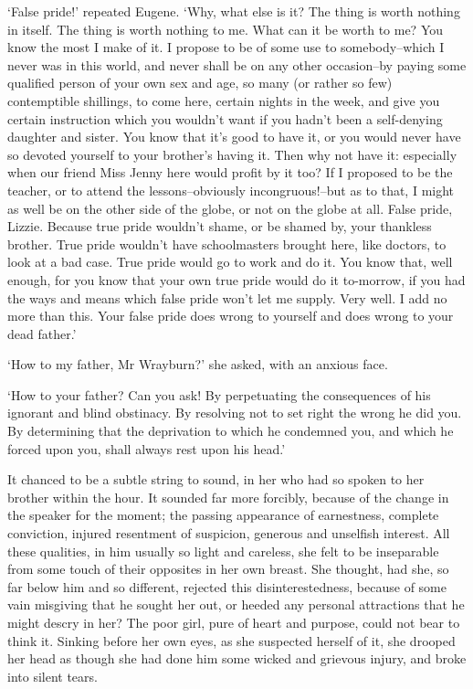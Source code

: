 ‘False pride!’ repeated Eugene. ‘Why, what else is it? The thing is
worth nothing in itself. The thing is worth nothing to me. What can it
be worth to me? You know the most I make of it. I propose to be of some
use to somebody--which I never was in this world, and never shall be on
any other occasion--by paying some qualified person of your own sex and
age, so many (or rather so few) contemptible shillings, to come here,
certain nights in the week, and give you certain instruction which you
wouldn’t want if you hadn’t been a self-denying daughter and sister.
You know that it’s good to have it, or you would never have so devoted
yourself to your brother’s having it. Then why not have it: especially
when our friend Miss Jenny here would profit by it too? If I proposed to
be the teacher, or to attend the lessons--obviously incongruous!--but
as to that, I might as well be on the other side of the globe, or not
on the globe at all. False pride, Lizzie. Because true pride wouldn’t
shame, or be shamed by, your thankless brother. True pride wouldn’t have
schoolmasters brought here, like doctors, to look at a bad case. True
pride would go to work and do it. You know that, well enough, for you
know that your own true pride would do it to-morrow, if you had the ways
and means which false pride won’t let me supply. Very well. I add no
more than this. Your false pride does wrong to yourself and does wrong
to your dead father.’

‘How to my father, Mr Wrayburn?’ she asked, with an anxious face.

‘How to your father? Can you ask! By perpetuating the consequences of
his ignorant and blind obstinacy. By resolving not to set right the
wrong he did you. By determining that the deprivation to which he
condemned you, and which he forced upon you, shall always rest upon his
head.’

It chanced to be a subtle string to sound, in her who had so spoken to
her brother within the hour. It sounded far more forcibly, because of
the change in the speaker for the moment; the passing appearance of
earnestness, complete conviction, injured resentment of suspicion,
generous and unselfish interest. All these qualities, in him usually so
light and careless, she felt to be inseparable from some touch of their
opposites in her own breast. She thought, had she, so far below him
and so different, rejected this disinterestedness, because of some vain
misgiving that he sought her out, or heeded any personal attractions
that he might descry in her? The poor girl, pure of heart and purpose,
could not bear to think it. Sinking before her own eyes, as she
suspected herself of it, she drooped her head as though she had done him
some wicked and grievous injury, and broke into silent tears.

